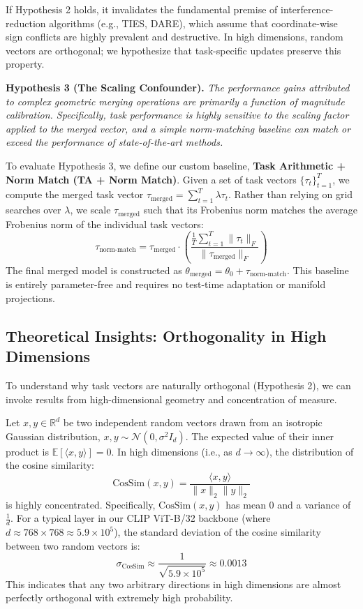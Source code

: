 \documentclass{article}
\begin{document}
If Hypothesis 2 holds, it invalidates the fundamental premise of interference-reduction algorithms (e.g., TIES, DARE), which assume that coordinate-wise sign conflicts are highly prevalent and destructive. In high dimensions, random vectors are orthogonal; we hypothesize that task-specific updates preserve this property.

\textbf{Hypothesis 3 (The Scaling Confounder).} \textit{The performance gains attributed to complex geometric merging operations are primarily a function of magnitude calibration. Specifically, task performance is highly sensitive to the scaling factor applied to the merged vector, and a simple norm-matching baseline can match or exceed the performance of state-of-the-art methods.}

To evaluate Hypothesis 3, we define our custom baseline, \textbf{Task Arithmetic + Norm Match (TA + Norm Match)}. Given a set of task vectors $\{\tau_t\}_{t=1}^T$, we compute the merged task vector $\tau_{\text{merged}} = \sum_{t=1}^T \lambda \tau_t$. Rather than relying on grid searches over $\lambda$, we scale $\tau_{\text{merged}}$ such that its Frobenius norm matches the average Frobenius norm of the individual task vectors:
\begin{equation}
    \tau_{\text{norm-match}} = \tau_{\text{merged}} \cdot \left( \frac{\frac{1}{T} \sum_{t=1}^T \|\tau_t\|_F}{\|\tau_{\text{merged}}\|_F} \right)
\end{equation}
The final merged model is constructed as $\theta_{\text{merged}} = \theta_0 + \tau_{\text{norm-match}}$. This baseline is entirely parameter-free and requires no test-time adaptation or manifold projections.

\subsection{Theoretical Insights: Orthogonality in High Dimensions}

To understand why task vectors are naturally orthogonal (Hypothesis 2), we can invoke results from high-dimensional geometry and concentration of measure. 

Let $x, y \in \mathbb{R}^d$ be two independent random vectors drawn from an isotropic Gaussian distribution, $x, y \sim \mathcal{N}(0, \sigma^2 I_d)$. The expected value of their inner product is $\mathbb{E}[\langle x, y \rangle] = 0$. In high dimensions (i.e., as $d \to \infty$), the distribution of the cosine similarity:
\begin{equation}
    \text{CosSim}(x, y) = \frac{\langle x, y \rangle}{\|x\|_2 \|y\|_2}
\end{equation}
is highly concentrated. Specifically, $\text{CosSim}(x, y)$ has mean $0$ and a variance of $\frac{1}{d}$. For a typical layer in our CLIP ViT-B/32 backbone (where $d \approx 768 \times 768 \approx 5.9 \times 10^5$), the standard deviation of the cosine similarity between two random vectors is:
\begin{equation}
    \sigma_{\text{CosSim}} \approx \frac{1}{\sqrt{5.9 \times 10^5}} \approx 0.0013
\end{equation}
This indicates that any two arbitrary directions in high dimensions are almost perfectly orthogonal with extremely high probability.
\end{document}
